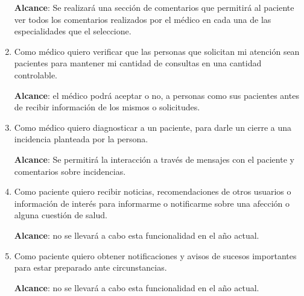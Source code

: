 \begin{enumerate}
    \textbf{Alcance}: Se realizará una sección de comentarios que permitirá al paciente ver todos los comentarios realizados por el médico en cada una de las especialidades que el seleccione.
    
    

	\item Como médico quiero verificar que las personas que solicitan mi atención sean pacientes para mantener mi cantidad de consultas en una cantidad controlable.
    
    \textbf{Alcance}: el médico podrá aceptar o no, a personas como sus pacientes antes de recibir información de los mismos o solicitudes.
	\item Como médico quiero diagnosticar a un paciente, para darle un cierre a una incidencia planteada por la persona.
    
    \textbf{Alcance}: Se permitirá la interacción a través de mensajes con el paciente y comentarios sobre incidencias.
	
    \item Como paciente quiero recibir noticias, recomendaciones de otros usuarios o información de interés para informarme o notificarme sobre una afección o alguna cuestión de salud.
    
    \textbf{Alcance}: no se llevará a cabo esta funcionalidad en el año actual. %
    
	\item Como paciente quiero obtener notificaciones y avisos de sucesos importantes para estar preparado ante circunstancias.
    
    \textbf{Alcance}: no se llevará a cabo esta funcionalidad en el año actual. %
    
\end{enumerate}
